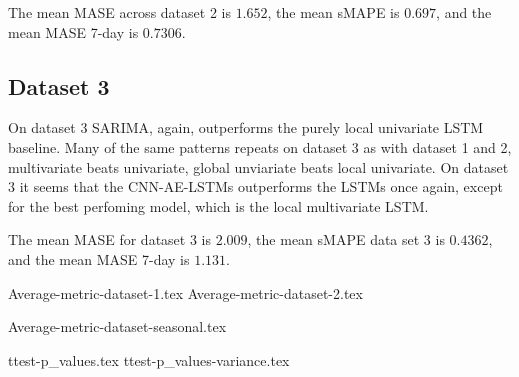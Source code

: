 The mean MASE across dataset 2 is $1.652$,
the mean sMAPE is $0.697$,
and the mean MASE 7-day is  $0.7306$.

\subsection{Dataset 3}
On dataset 3 SARIMA, again, outperforms the purely local univariate LSTM baseline.
Many of the same patterns repeats on dataset 3 as with dataset 1 and 2, multivariate beats univariate,
global unviariate beats local univariate.
On dataset 3 it seems that the CNN-AE-LSTMs outperforms the LSTMs once again, except for the
best perfoming model, which is the local multivariate LSTM.

The mean MASE for dataset 3 is $2.009$,
the mean sMAPE data set 3 is $0.4362$,
and the mean MASE 7-day is $1.131$.



{Average-metric-dataset-1.tex}
{Average-metric-dataset-2.tex}

{Average-metric-dataset-seasonal.tex}

{ttest-p_values.tex}
{ttest-p_values-variance.tex}


